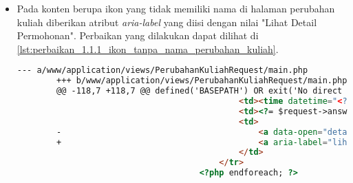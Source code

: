 \begin{itemize}
\begin{lstlisting}[frame=single, label={lst:perbaikan_1.1.1_ikon_tanpa_nama_manajemen_cetak_transkrip}, language=HTML, caption=Perbaikan Kriteria Sukses 1.1.1 - Ikon Tanpa Nama di Halaman Manajemen Cetak Transkrip]
                                                </button>
                                            </div>
        -                                    <a data-open="cetak<?= $request->id ?>"><i class="fi-print"></i></a>
        +                                    <a aria-label="cetak permohonan" data-open="cetak<?= $request->id ?>"><i class="fi-print"></i></a>
                                            <div class="reveal" id="hapus<?= $request->id ?>" data-reveal>
                                                <h5>Hapus Permohonan</h5>
                                                <form method="POST" action="/TranskripManage/remove">
        @@ -146,7 +146,7 @@ defined('BASEPATH') OR exit('No direct script access allowed');
                                                    <span aria-hidden="true">&times;</span>
                                                </button>
                                            </div>
        -                                    <a data-open="hapus<?= $request->id ?>"><i class="fi-trash"></i></a>
        +                                    <a aria-label="hapus permohonan" data-open="hapus<?= $request->id ?>"><i class="fi-trash"></i></a>
                                        </td>
                                    </tr>
                                <?php endforeach; ?>
    \end{lstlisting}

    \item Pada konten berupa ikon yang tidak memiliki nama di halaman perubahan kuliah diberikan atribut \textit{aria-label} yang diisi dengan nilai "Lihat Detail Permohonan". Perbaikan yang dilakukan dapat dilihat di \ref{lst:perbaikan_1.1.1_ikon_tanpa_nama_perubahan_kuliah}.
    \begin{lstlisting}[frame=single, label={lst:perbaikan_1.1.1_ikon_tanpa_nama_perubahan_kuliah}, language=HTML, caption=Perbaikan Kriteria Sukses 1.1.1 - Ikon Tanpa Nama di Halaman Perubahan Kuliah]
        --- a/www/application/views/PerubahanKuliahRequest/main.php
        +++ b/www/application/views/PerubahanKuliahRequest/main.php
        @@ -118,7 +118,7 @@ defined('BASEPATH') OR exit('No direct script access allowed');
                                             <td><time datetime="<?= $request->answeredDateTime ?>"><?= $request->answeredDateString ?></time></td>
                                             <td><?= $request->answeredMessage ?></td>
                                             <td>
        -                                        <a data-open="detail<?= $request->id ?>"><i class="fi-eye"></i></a>
        +                                        <a aria-label="lihat detail permohonan" data-open="detail<?= $request->id ?>"><i class="fi-eye"></i></a>
                                             </td>
                                         </tr>
                                     <?php endforeach; ?>        
    \end{lstlisting}


\end{itemize}
